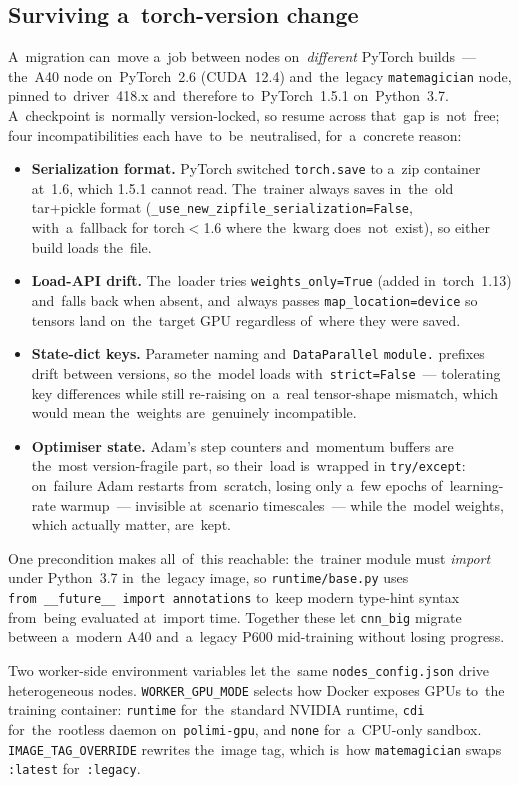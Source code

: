 \subsection{Surviving a~torch-version change}

A~migration can~move a~job between nodes on~\emph{different} PyTorch builds~---
the~A40 node on~PyTorch~2.6 (CUDA~12.4) and~the~legacy \texttt{matemagician}
node, pinned to~driver~418.x and~therefore to~PyTorch~1.5.1 on~Python~3.7.
A~checkpoint is~normally version-locked, so resume across that~gap is~not~free;
four incompatibilities each have~to~be~neutralised, for~a~concrete reason:

\begin{itemize}
  \item \textbf{Serialization format.}  PyTorch switched \texttt{torch.save} to
        a~zip container at~1.6, which 1.5.1 cannot read.  The~trainer always
        saves in~the~old tar+pickle format
        (\texttt{\_use\_new\_zipfile\_serialization=False}, with~a~fallback for
        torch${<}$1.6 where the~kwarg does~not~exist), so either build loads the~file.
  \item \textbf{Load-API drift.}  The~loader tries \texttt{weights\_only=True}
        (added in~torch~1.13) and~falls back when absent, and~always passes
        \texttt{map\_location=device} so tensors land on~the~target GPU
        regardless of~where they were saved.
  \item \textbf{State-dict keys.}  Parameter naming and~\texttt{DataParallel}
        \texttt{module.} prefixes drift between versions, so the~model loads
        with~\texttt{strict=False}~--- tolerating key differences while still
        re-raising on~a~real tensor-shape mismatch, which would mean the~weights
        are~genuinely incompatible.
  \item \textbf{Optimiser state.}  Adam's step counters and~momentum buffers are
        the~most version-fragile part, so their~load is~wrapped in
        \texttt{try/except}: on~failure Adam restarts from~scratch, losing only
        a~few epochs of~learning-rate warmup~--- invisible at~scenario
        timescales~--- while the~model weights, which actually matter, are~kept.
\end{itemize}

One precondition makes all~of~this reachable: the~trainer module must \emph{import}
under Python~3.7 in~the~legacy image, so \texttt{runtime/base.py} uses
\texttt{from~\_\_future\_\_ import annotations} to~keep modern type-hint syntax
from~being evaluated at~import time.  Together these let \texttt{cnn\_big} migrate
between a~modern A40 and~a~legacy P600 mid-training without losing progress.

Two worker-side environment variables let the~same
\texttt{nodes\_config.json} drive heterogeneous nodes.
\texttt{WORKER\_GPU\_MODE} selects how Docker exposes GPUs to~the
training container: \texttt{runtime} for~the~standard NVIDIA runtime,
\texttt{cdi} for~the~rootless daemon on~\texttt{polimi-gpu}, and
\texttt{none} for~a~CPU-only sandbox.  \texttt{IMAGE\_TAG\_OVERRIDE}
rewrites the~image tag, which is~how \texttt{matemagician} swaps
\texttt{:latest} for~\texttt{:legacy}.
